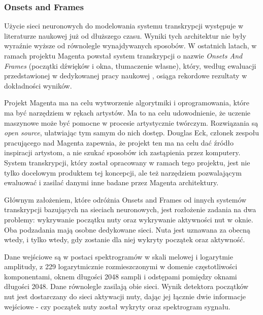 \documentclass[12pt,a4paper,twoside]{mwart}
\begin{document}


\subsubsection{Onsets and Frames}\label{sec:multif0:onsetsAndFrames}
Użycie sieci neuronowych do modelowania systemu transkrypcji występuje w literaturze naukowej już od dłuższego czasu. Wyniki tych architektur nie były wyraźnie wyższe od równolegle wynajdywanych sposobów. W ostatnich latach, w ramach projektu Magenta \cite{Transcription:Magenta} powstał system transkrypcji o nazwie \textit{Onsets And Frames} (początki dźwięków i okna, tłumaczenie własne), który, według ewaluacji przedstawionej w dedykowanej pracy naukowej \cite{Transcription:Hawthorne:OnsetsAndFrames}, osiąga rekordowe rezultaty w dokładności wyników.

Projekt Magenta ma na celu wytworzenie algorytmiki i oprogramowania, które ma być narzędziem w rękach artystów. Ma to na celu udowodnienie, że uczenie maszynowe może być pomocne w procesie artystycznie twórczym. Rozwiązania są \textit{open source}, ułatwiając tym samym do nich dostęp. Douglas Eck, członek zespołu pracującego nad Magenta zapewnia, że projekt ten ma na celu dać źródło inspiracji artystom, a nie szukać sposobów ich zastąpienia przez komputery. System transkrypcji, który został opracowany w ramach tego projektu, jest nie tylko docelowym produktem tej koncepcji, ale też narzędziem pozwalającym ewaluować i zasilać danymi inne badane przez Magenta architektury.

Głównym założeniem, które odróżnia Onsets and Frames od innych systemów transkrypcji bazujących na sieciach neuronowych, jest rozłożenie zadania na dwa problemy: wykrywanie początku nuty oraz wykrywanie aktywności nut w oknie. Oba pod\-zadania mają osobne dedykowane sieci. Nuta jest uznawana za obecną wtedy, i tylko wtedy, gdy zostanie dla niej wykryty początek oraz aktywność.

Dane wejściowe są w postaci spektrogramów w skali melowej i logarytmie amplitudy, z 229 logarytmicznie rozmieszczonymi w domenie częstotliwości komponentami, oknem długości 2048 sampli i odstępami pomiędzy oknami długości 2048. Dane równolegle zasilają obie sieci. Wynik detektora początków nut jest dostarczany do sieci aktywacji nuty, dając jej łącznie dwie informacje wejściowe - czy  początek nuty został wykryty oraz spektrogram sygnału.
\end{document}

